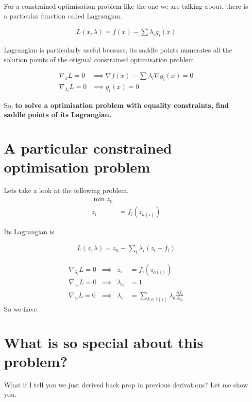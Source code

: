 \documentclass[10pt]{article}
\begin{document}
For a constrained optimisation problem like the one we are talking about, there is a particular function called Lagrangian. 


$$\begin{aligned}
L(x,\lambda) =  f(x) - \sum \lambda_i g_i(\ddot{x})
\end{aligned}$$

Lagrangian is particularly useful because, its saddle points numerates all the solution points of the original constrained optimisation problem.

$$\begin{aligned}
\nabla_x L=0 &\implies \nabla f(x) - \sum \lambda_i \nabla g_i(x) = 0
\\
\nabla_{\lambda_i} L=0 &\implies g_i(x)=0
\end{aligned}$$

So, \textbf{to solve a optimisation problem with equality constraints, find saddle points of its Lagrangian.}

\section{A particular constrained optimisation problem}
Lets take a look at the following problem. 
$$\begin{aligned}
\min z_n
\\
z_i &= f_i(z_{a(i)})
\end{aligned}$$

Its Lagrangian is

$$\begin{aligned}
L(z,\lambda) = z_n - \sum_i \lambda_i (z_i - f_i)
\end{aligned}$$


$$\begin{aligned}
\nabla_{\lambda_i} L = 0 &\implies&      z_i  &= f_i(z_{a(i)})
\\  
\nabla_{z_n}       L = 0 &\implies& \lambda_n &= 1
\\
\nabla_{z_i}       L = 0 &\implies& \lambda_i &= \sum_{k \in b(i)} \lambda_k \frac{\partial f_k}{\partial z_k}
\end{aligned}$$
So we have

\section{What is so special about this problem?}
What if I tell you we just derived back prop in previous derivations? Let me show you.
\end{document}
